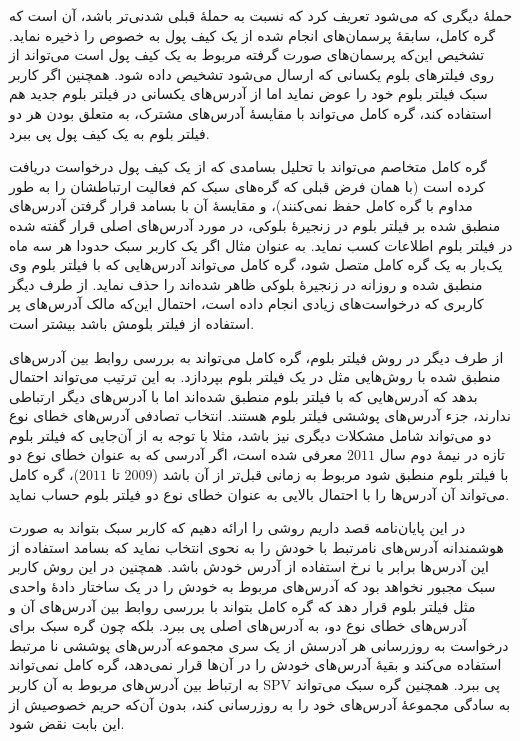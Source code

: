 حملهٔ دیگری که می‌شود تعریف کرد که نسبت به حملهٔ قبلی شدنی‌تر باشد، آن است که گره کامل، سابقهٔ پرسمان‌های انجام شده از یک کیف پول به خصوص را ذخیره نماید. تشخیص این‌که پرسمان‌های صورت گرفته مربوط به یک کیف پول است می‌تواند از روی فیلتر‌های بلوم یکسانی که ارسال می‌شود تشخیص داده شود. همچنین اگر کاربر سبک فیلتر بلوم خود را عوض نماید اما از آدرس‌های یکسانی در فیلتر بلوم جدید هم استفاده کند،‌ گره کامل می‌تواند با مقایسهٔ آدرس‌های مشترک، به متعلق بودن هر دو فیلتر بلوم به یک کیف پول پی ببرد.

گره کامل متخاصم می‌تواند با تحلیل بسامدی که از یک کیف پول درخواست دریافت کرده است (با همان فرض قبلی که گره‌های سبک کم فعالیت ارتباطشان را به طور مداوم با گره کامل حفظ نمی‌کنند)، و مقایسهٔ آن با بسامد قرار گرفتن آدرس‌های منطبق شده بر فیلتر بلوم در زنجیرهٔ بلوکی، در مورد آدرس‌های اصلی قرار گفته شده در فیلتر بلوم اطلاعات کسب نماید. به عنوان مثال اگر یک کاربر سبک حدودا هر سه ماه یک‌بار به یک گره کامل متصل شود، گره کامل می‌تواند آدرس‌هایی که با فیلتر بلوم وی منطبق شده و روزانه در زنجیرهٔ بلوکی ظاهر شده‌اند را حذف نماید. از طرف دیگر کاربری که درخواست‌های زیادی انجام داده است، احتمال این‌که مالک آدرس‌های پر استفاده از فیلتر بلومش باشد بیشتر است. 

از طرف دیگر در روش فیلتر بلوم، گره کامل می‌تواند به بررسی روابط بین آدرس‌های منطبق شده با روش‌هایی مثل \cite{Meiklejohn2013} در یک فیلتر بلوم بپردازد. به این ترتیب می‌تواند احتمال بدهد که آدرس‌هایی که با فیلتر بلوم منطبق شده‌اند اما با آدرس‌های دیگر ارتباطی ندارند، جزء آدرس‌های پوششی فیلتر بلوم هستند\cite{Gervais2014}.  انتخاب تصادفی آدرس‌های خطای نوع دو می‌تواند شامل مشکلات دیگری نیز باشد، مثلا با توجه به \cite{Gervais2014} از آن‌جایی که فیلتر بلوم تازه در نیمهٔ دوم سال $2011$ معرفی شده است، اگر آدرسی که به عنوان خطای نوع دو با فیلتر بلوم منطبق شود مربوط به زمانی قبل‌تر از آن باشد ($2009$ تا $2011$)، گره کامل می‌تواند آن آدرس‌ها را با احتمال بالایی به عنوان خطای نوع دو فیلتر بلوم حساب نماید.

در این پایان‌نامه قصد داریم روشی را ارائه دهیم که کاربر سبک بتواند به صورت هوشمندانه آدرس‌های نامرتبط با خودش را به نحوی انتخاب نماید که بسامد استفاده از این آدرس‌ها برابر با نرخ استفاده از آدرس خودش باشد. همچنین در این روش کاربر سبک مجبور نخواهد بود که آدرس‌های مربوط به خودش را در یک ساختار دادهٔ واحدی مثل فیلتر بلوم قرار دهد که گره کامل بتواند با بررسی روابط بین آدرس‌های آن و آدرس‌های خطای نوع دو،‌ به آدرس‌های اصلی پی ببرد. بلکه چون گره سبک برای درخواست به روزرسانی هر آدرسش از یک سری مجموعه آدرس‌های پوششی نا مرتبط استفاده می‌کند و بقیهٔ آدرس‌های خودش را در آن‌ها قرار نمی‌دهد، گره کامل نمی‌تواند به ارتباط بین آدرس‌های مربوط به آن کاربر SPV پی ببرد. همچنین گره سبک می‌تواند به سادگی مجموعهٔ آدرس‌های خود را به روزرسانی کند، بدون آن‌که حریم خصوصیش از این بابت نقض شود.  


